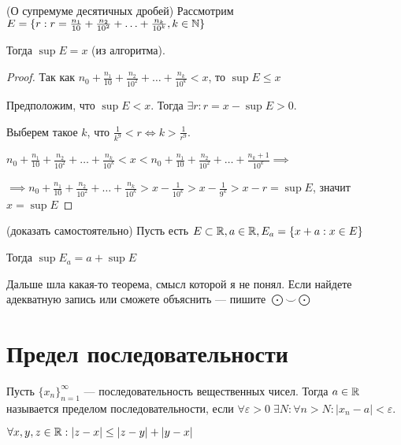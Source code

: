 \begin{theorem} (О супремуме десятичных дробей)
    Рассмотрим $E = \{r: r = \frac{n_1}{10} + \frac{n_2}{10^2} + \ldots + \frac{n_k}{10^k}, k \in \mathbb{N}\}$

    Тогда $\sup E = x$ (из алгоритма).
\end{theorem}

\begin{proof}
    
    Так как $n_0 + \frac{n_1}{10} + \frac{n_2}{10^2} + \ldots + \frac{n_k}{10^k} < x$, то $\sup E \leq x$

    Предположим, что $\sup E < x$. Тогда $\exists r: r = x - \sup E > 0$.

    Выберем такое $k$, что $\frac{1}{k^9} < r \Leftrightarrow k > \frac{1}{r^9}$.

    $n_0 + \frac{n_1}{10} + \frac{n_2}{10^2} + \ldots + \frac{n_k}{10^k} < x < n_0 + \frac{n_1}{10} + \frac{n_2}{10^2} + \ldots + \frac{n_k + 1}{10^k} \implies$

    $\implies n_0 + \frac{n_1}{10} + \frac{n_2}{10^2} + \ldots + \frac{n_k}{10^k} > x - \frac{1}{10^k} > x - \frac{1}{9^k} > x - r = \sup E$, значит $x = \sup E$
\end{proof}

\begin{lemma} (доказать самостоятельно)
    Пусть есть $E \subset \mathbb{R}, a \in \mathbb{R}, E_a = \{x + a: x \in E\}$

    Тогда $\sup E_a = a + \sup E$
\end{lemma}


Дальше шла какая-то теорема, смысл которой я не понял. Если найдете адекватную запись или сможете объяснить --- пишите $\bigodot \smile \bigodot $

\section{Предел последовательности}

\begin{definition}
    Пусть $\{x_n\}_{n=1}^{\infty}$ --- последовательность вещественных чисел. Тогда $a \in \mathbb{R}$ называется пределом последовательности, если $\forall \varepsilon > 0 \; \exists N: \forall n > N: |x_n - a| < \varepsilon$.
\end{definition}

\begin{remark}
    $\forall x, y, z \in \mathbb{R}: |z - x| \leq |z - y| + |y - x|$
\end{remark}

